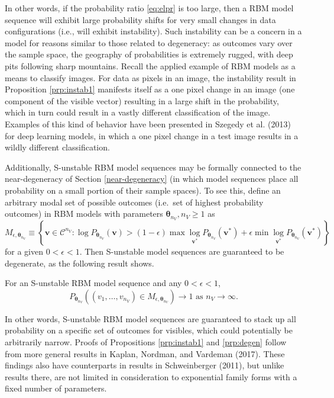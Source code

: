 \documentclass[AMS,STIX1COL]{WileyNJD-v2}
\newcommand{\nv}{{n_{\scriptscriptstyle V}}}
\begin{document}
In other words, if the probability ratio \eqref{eq:elpr} is too large,
then a RBM model sequence will exhibit large probability shifts for very
small changes in data configurations (i.e., will exhibit instability).
Such instability can be a concern in a model for reasons similar to
those related to degeneracy: as outcomes vary over the sample space, the
geography of probabilities is extremely rugged, with deep pits following
sharp mountains. Recall the applied example of RBM models as a means to
classify images. For data as pixels in an image, the instability result
in Proposition \ref{prp:instab1} manifests itself as a one pixel change
in an image (one component of the visible vector) resulting in a large
shift in the probability, which in turn could result in a vastly
different classification of the image. Examples of this kind of behavior
have been presented in Szegedy et al. (2013) for deep learning models,
in which a one pixel change in a test image results in a wildly
different classification.

Additionally, S-unstable RBM model sequences may be formally connected
to the near-degeneracy of Section \ref{near-degeneracy} (in which model
sequences place all probability on a small portion of their sample
spaces). To see this, define an arbitrary modal set of possible outcomes
(i.e.~set of highest probability outcomes) in RBM models with parameters
\(\boldsymbol \theta_\nv, \nv \ge 1\) as \[
M_{\epsilon, \boldsymbol \theta_\nv} \equiv \left\{\boldsymbol v \in \mathcal{C}^\nv: \log P_{\boldsymbol \theta_\nv}(\boldsymbol v) > (1-\epsilon)\max\log\limits_{\boldsymbol v^*}P_{\boldsymbol \theta_\nv}(\boldsymbol v^*) + \epsilon\min\log\limits_{\boldsymbol v^*}P_{\boldsymbol \theta_\nv}(\boldsymbol v^*) \right\}
\] for a given \(0 < \epsilon < 1\). Then S-unstable model sequences are
guaranteed to be degenerate, as the following result shows.

\begin{proposition}
\label{prp:degen}
For an S-unstable RBM model sequence and any $0 < \epsilon < 1$, 
$$
P_{\boldsymbol \theta_\nv}\left((v_1, \dots, v_\nv) \in M_{\epsilon, \boldsymbol \theta_\nv}\right) \rightarrow 1 \text{ as } \nv \rightarrow \infty.
$$
\end{proposition}

In other words, S-unstable RBM model sequences are guaranteed to stack
up all probability on a specific set of outcomes for visibles, which
could potentially be arbitrarily narrow. Proofs of Propositions
\ref{prp:instab1} and \ref{prp:degen} follow from more general results
in Kaplan, Nordman, and Vardeman (2017). These findings also have
counterparts in results in Schweinberger (2011), but unlike results
there, are not limited in consideration to exponential family forms with
a fixed number of parameters.
\end{document}
